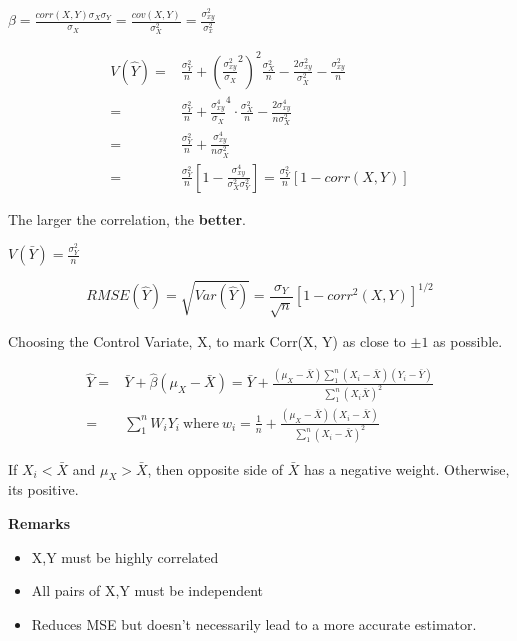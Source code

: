 \documentclass[11pt]{article}
\begin{document}
\(\beta = \frac{corr(X, Y) \sigma_X \sigma_Y}{\sigma_X} =
\frac{cov(X,Y)}{\sigma_X^2} = \frac{\sigma_{xy}^2}{\sigma_x^2}\)


\begin{equation}
\begin{split}
V(\hat Y) = & \frac{\sigma_Y^2}{n} + (\frac{\sigma_{xy}^2}{\sigma_X}^2)^2 \frac{\sigma_X^2}{n} - \frac{2 \sigma_{xy}^2}{\sigma_X^2} - \frac{\sigma_{xy}^2}{n}\\
= & \frac{\sigma_Y^2}{n} + \frac{\sigma_{xy}^4}{\sigma_X}^4 \cdot \frac{\sigma_X^2}{n} - \frac{2 \sigma_{xy}^4}{n \sigma_X^2}\\
= & \frac{\sigma_Y^2}{n} + \frac{\sigma_{xy}^4}{n \sigma_X^2}\\
= & \frac{\sigma_Y^2}{n}[1 - \frac{\sigma_{xy}^4}{\sigma_X^2 \sigma_Y^2}] = \frac{\sigma_Y^2}{n}[1 - corr(X,Y)]
\end{split}
\end{equation}

The larger the correlation, the \textbf{better}.


\(V(\bar Y) = \frac{\sigma_Y^2}{n}\)

$$RMSE (\hat Y) = \sqrt{Var(\hat Y)} = \frac{\sigma_Y}{\sqrt n} [1 - corr^2(X, Y)]^{1/2}$$

Choosing the Control Variate, X, to mark Corr(X, Y) as close to \(\pm 1\) as
possible.

\begin{equation}
\begin{split}
\hat Y = & \bar Y + \hat \beta (\mu_X - \bar X) = \bar Y + \frac{(\mu_X - \bar X) \sum_{1}^{n}(X_i - \bar X)(Y_i - \bar Y)}{\sum_{1}^{n} (X_i \bar X)^2}\\
= & \sum_{1}^{n} W_i Y_i \ \text{where} \ w_i = \frac{1}{n} + \frac{(\mu_X - \bar X)(X_i - \bar X)}{\sum_{1}^{n} (X_i - \bar X)^2}
\end{split}
\end{equation}

If \(X_i < \bar X\) and \(\mu_X > \bar X\), then opposite side of \(\bar X\) has a
negative weight. Otherwise, its positive.


\textbf{Remarks}
\begin{itemize}
\item X,Y must be highly correlated
\item All pairs of X,Y must be independent
\item Reduces MSE but doesn't necessarily lead to a more accurate estimator.
\end{itemize}
\end{document}
